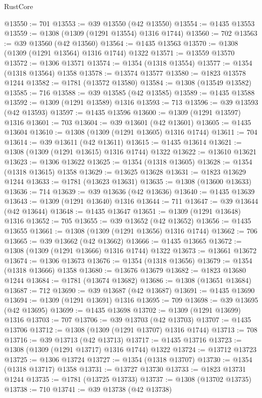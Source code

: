 \begin{lexlean}{RustCore}
\begin{coremodule}
@13550 := 701
@13553 := @39 @13550 (@42 @13550)
@13554 := @1435 @13553
@13559 := @1308 (@1309 (@1291 @13554) @1316 @1744)
@13560 := 702
@13563 := @39 @13560 (@42 @13560)
@13564 := @1435 @13563
@13570 := @1308 (@1309 (@1291 @13564) @1316 @1744) @1322
@13571 := @13559 @13570
@13572 := @1306 @13571
@13574 := @1354 (@1318 @13554)
@13577 := @1354 (@1318 @13564) @1358
@13578 := @13574 @13577
@13580 := @1823 @13578 @1244
@13582 := @1781 (@13572 @13580)
@13584 := @1308 (@13549 @13582)
@13585 := 716
@13588 := @39 @13585 (@42 @13585)
@13589 := @1435 @13588
@13592 := @1309 (@1291 @13589) @1316
@13593 := 713
@13596 := @39 @13593 (@42 @13593)
@13597 := @1435 @13596
@13600 := @1309 (@1291 @13597) @1316
@13601 := 703
@13604 := @39 @13601 (@42 @13601)
@13605 := @1435 @13604
@13610 := @1308 (@1309 (@1291 @13605) @1316 @1744)
@13611 := 704
@13614 := @39 @13611 (@42 @13611)
@13615 := @1435 @13614
@13621 := @1308 (@1309 (@1291 @13615) @1316 @1744) @1322
@13622 := @13610 @13621
@13623 := @1306 @13622
@13625 := @1354 (@1318 @13605)
@13628 := @1354 (@1318 @13615) @1358
@13629 := @13625 @13628
@13631 := @1823 @13629 @1244
@13633 := @1781 (@13623 @13631)
@13635 := @1308 (@13600 @13633)
@13636 := 714
@13639 := @39 @13636 (@42 @13636)
@13640 := @1435 @13639
@13643 := @1309 (@1291 @13640) @1316
@13644 := 711
@13647 := @39 @13644 (@42 @13644)
@13648 := @1435 @13647
@13651 := @1309 (@1291 @13648) @1316
@13652 := 705
@13655 := @39 @13652 (@42 @13652)
@13656 := @1435 @13655
@13661 := @1308 (@1309 (@1291 @13656) @1316 @1744)
@13662 := 706
@13665 := @39 @13662 (@42 @13662)
@13666 := @1435 @13665
@13672 := @1308 (@1309 (@1291 @13666) @1316 @1744) @1322
@13673 := @13661 @13672
@13674 := @1306 @13673
@13676 := @1354 (@1318 @13656)
@13679 := @1354 (@1318 @13666) @1358
@13680 := @13676 @13679
@13682 := @1823 @13680 @1244
@13684 := @1781 (@13674 @13682)
@13686 := @1308 (@13651 @13684)
@13687 := 712
@13690 := @39 @13687 (@42 @13687)
@13691 := @1435 @13690
@13694 := @1309 (@1291 @13691) @1316
@13695 := 709
@13698 := @39 @13695 (@42 @13695)
@13699 := @1435 @13698
@13702 := @1309 (@1291 @13699) @1316
@13703 := 707
@13706 := @39 @13703 (@42 @13703)
@13707 := @1435 @13706
@13712 := @1308 (@1309 (@1291 @13707) @1316 @1744)
@13713 := 708
@13716 := @39 @13713 (@42 @13713)
@13717 := @1435 @13716
@13723 := @1308 (@1309 (@1291 @13717) @1316 @1744) @1322
@13724 := @13712 @13723
@13725 := @1306 @13724
@13727 := @1354 (@1318 @13707)
@13730 := @1354 (@1318 @13717) @1358
@13731 := @13727 @13730
@13733 := @1823 @13731 @1244
@13735 := @1781 (@13725 @13733)
@13737 := @1308 (@13702 @13735)
@13738 := 710
@13741 := @39 @13738 (@42 @13738)

\end{coremodule}
\end{lexlean}
